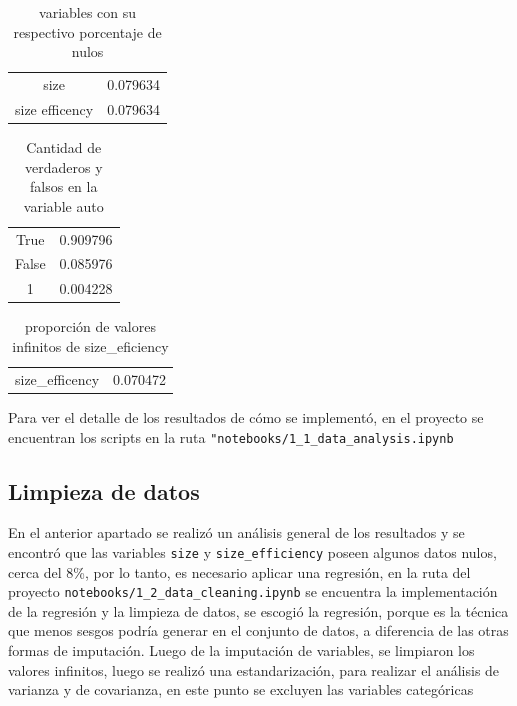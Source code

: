 \documentclass[journal]{IEEEtran}
\begin{document}
	
	\begin{table}[H]
		\centering
		\begin{tabular}{cc}
			size   & 0.079634 \\
			size efficency & 0.079634 \\
		\end{tabular}
		\caption{variables con su respectivo porcentaje de nulos}
		\label{tab:placeholder}
	\end{table}
	
	\begin{table}[H]
		\centering
		\begin{tabular}{cc}
			True   & 0.909796 \\
			False &  0.085976 \\
			1 & 0.004228 \\
		\end{tabular}
		\caption{Cantidad de verdaderos y falsos en la variable auto}
		\label{tab:placeholder}
	\end{table}
	
	\begin{table}[H]
		\centering
		\begin{tabular}{cc}
			size\_efficency   &  0.070472 \\
		\end{tabular}
		\caption{proporción de valores infinitos de size\_eficiency}
		\label{tab:placeholder}
	\end{table}
	Para ver el detalle de los resultados de cómo se implementó, en el proyecto se encuentran los scripts en la ruta \texttt{"notebooks/1\_1\_data\_analysis.ipynb}
	
	\subsection{Limpieza de datos}
	En el anterior apartado se realizó un análisis general de los resultados y se encontró que las variables \texttt{size} y \texttt{size\_efficiency} poseen algunos datos nulos, cerca del 8\%, por lo tanto, es necesario aplicar una regresión, en la ruta del proyecto \texttt{notebooks/1\_2\_data\_cleaning.ipynb} se encuentra la implementación de la regresión y la limpieza de datos, se escogió la regresión, porque es la técnica que menos sesgos podría generar en el conjunto de datos, a diferencia de las otras formas de imputación.
	Luego de la imputación de variables, se limpiaron los valores infinitos, luego se realizó una estandarización, para realizar el análisis de varianza y de covarianza, en este punto se excluyen las variables categóricas
	
\end{document}
